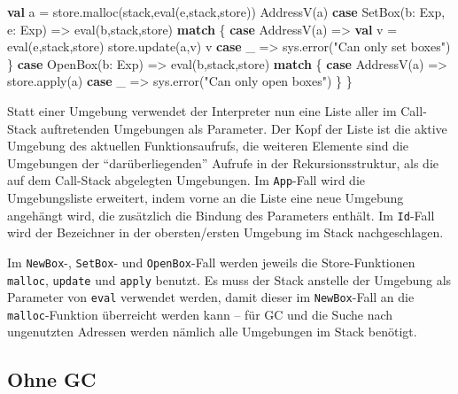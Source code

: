 \documentclass[]{article}
\newenvironment{Shaded}{}{}
\newcommand{\FunctionTok}[1]{\textcolor[rgb]{0.02,0.16,0.49}{#1}}
\newcommand{\KeywordTok}[1]{\textcolor[rgb]{0.00,0.44,0.13}{\textbf{#1}}}
\newcommand{\NormalTok}[1]{#1}
\newcommand{\StringTok}[1]{\textcolor[rgb]{0.25,0.44,0.63}{#1}}
\begin{document}
\begin{Shaded}
\begin{Highlighting}[]
    \KeywordTok{val}\NormalTok{ a = store.}\FunctionTok{malloc}\NormalTok{(stack,}\FunctionTok{eval}\NormalTok{(e,stack,store))}
    \FunctionTok{AddressV}\NormalTok{(a)}
  \KeywordTok{case} \FunctionTok{SetBox}\NormalTok{(b: Exp, e: Exp) =\textgreater{} }\FunctionTok{eval}\NormalTok{(b,stack,store) }\KeywordTok{match}\NormalTok{ \{}
    \KeywordTok{case} \FunctionTok{AddressV}\NormalTok{(a) =\textgreater{}}
      \KeywordTok{val}\NormalTok{ v = }\FunctionTok{eval}\NormalTok{(e,stack,store)}
\NormalTok{      store.}\FunctionTok{update}\NormalTok{(a,v)}
\NormalTok{      v}
    \KeywordTok{case}\NormalTok{ \_ =\textgreater{} sys.}\FunctionTok{error}\NormalTok{(}\StringTok{"Can only set boxes"}\NormalTok{)}
\NormalTok{  \}}
  \KeywordTok{case} \FunctionTok{OpenBox}\NormalTok{(b: Exp) =\textgreater{} }\FunctionTok{eval}\NormalTok{(b,stack,store) }\KeywordTok{match}\NormalTok{ \{}
    \KeywordTok{case} \FunctionTok{AddressV}\NormalTok{(a) =\textgreater{} store.}\FunctionTok{apply}\NormalTok{(a)}
    \KeywordTok{case}\NormalTok{ \_ =\textgreater{} sys.}\FunctionTok{error}\NormalTok{(}\StringTok{"Can only open boxes"}\NormalTok{)}
\NormalTok{  \}}
\NormalTok{\}}
\end{Highlighting}
\end{Shaded}

Statt einer Umgebung verwendet der Interpreter nun eine Liste aller im
Call-Stack auftretenden Umgebungen als Parameter. Der Kopf der Liste ist
die aktive Umgebung des aktuellen Funktionsaufrufs, die weiteren
Elemente sind die Umgebungen der ``darüberliegenden'' Aufrufe in der
Rekursionsstruktur, als die auf dem Call-Stack abgelegten Umgebungen. Im
\texttt{App}-Fall wird die Umgebungsliste erweitert, indem vorne an die
Liste eine neue Umgebung angehängt wird, die zusätzlich die Bindung des
Parameters enthält. Im \texttt{Id}-Fall wird der Bezeichner in der
obersten/ersten Umgebung im Stack nachgeschlagen.

Im \texttt{NewBox}-, \texttt{SetBox}- und \texttt{OpenBox}-Fall werden
jeweils die Store-Funktionen \texttt{malloc}, \texttt{update} und
\texttt{apply} benutzt. Es muss der Stack anstelle der Umgebung als
Parameter von \texttt{eval} verwendet werden, damit dieser im
\texttt{NewBox}-Fall an die \texttt{malloc}-Funktion überreicht werden
kann -- für GC und die Suche nach ungenutzten Adressen werden nämlich
alle Umgebungen im Stack benötigt.

\hypertarget{ohne-gc}{%
\subsection{Ohne GC}\label{ohne-gc}}
\end{document}
